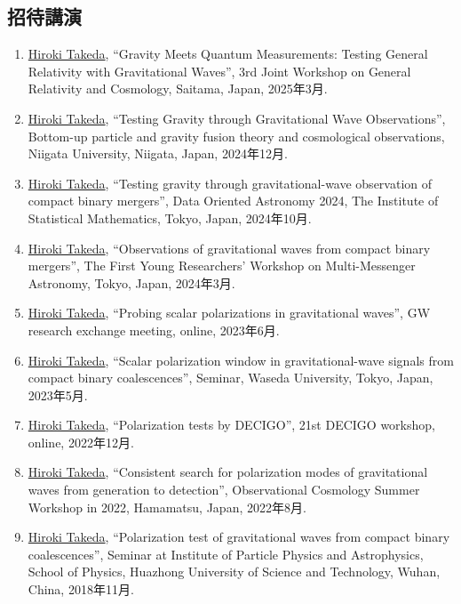 \documentclass[uplatex, 11pt]{jsarticle}
\begin{document}
\subsection*{招待講演}
\begin{enumerate}
\item \uline{Hiroki Takeda}, “Gravity Meets Quantum Measurements: Testing General Relativity with Gravitational Waves”, 3rd Joint Workshop on General Relativity and Cosmology, Saitama, Japan, 2025年3月.
\item \uline{Hiroki Takeda}, “Testing Gravity through Gravitational Wave Observations”, Bottom-up particle and gravity fusion theory and cosmological observations, Niigata University, Niigata, Japan, 2024年12月.
\item \uline{Hiroki Takeda}, “Testing gravity through gravitational-wave observation of compact binary mergers”, Data Oriented Astronomy 2024, The Institute of Statistical Mathematics, Tokyo, Japan, 2024年10月.
\item \uline{Hiroki Takeda}, “Observations of gravitational waves from compact binary mergers”, The First Young Researchers' Workshop on Multi-Messenger Astronomy, Tokyo, Japan, 2024年3月.
\item \uline{Hiroki Takeda}, “Probing scalar polarizations in gravitational waves”, GW research exchange meeting, online, 2023年6月.
\item \uline{Hiroki Takeda}, “Scalar polarization window in gravitational-wave signals from compact binary coalescences”, Seminar, Waseda University, Tokyo, Japan, 2023年5月.
\item \uline{Hiroki Takeda}, “Polarization tests by DECIGO”, 21st DECIGO workshop, online, 2022年12月.
\item \uline{Hiroki Takeda}, “Consistent search for polarization modes of gravitational waves from generation to detection”, Observational Cosmology Summer Workshop in 2022, Hamamatsu, Japan, 2022年8月.
\item \uline{Hiroki Takeda}, “Polarization test of gravitational waves from compact binary coalescences”, Seminar at Institute of Particle Physics and Astrophysics, School of Physics, Huazhong University of Science and Technology, Wuhan, China, 2018年11月.
\end{enumerate}
\end{document}
